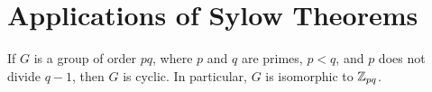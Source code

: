 \section{Applications of Sylow Theorems}

\begin{theorem}
	If $G$ is a group of order $pq$, where $p$ and $q$ are primes, $p < q$, and $p$ does not divide $q - 1$, then $G$ is cyclic. In particular, $G$ is isomorphic to $\mathbb{Z}_{pq}$.
\end{theorem}
